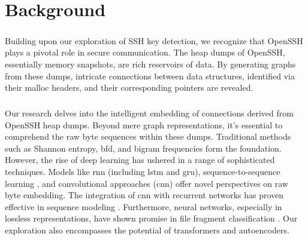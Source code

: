 \chapter{Background}\label{chap:background}



%






\paragraph*{}Building upon our exploration of SSH key detection, we recognize that OpenSSH plays a pivotal role in secure communication. The heap dumps of OpenSSH, essentially memory snapshots, are rich reservoirs of data. By generating graphs from these dumps, intricate connections between data structures, identified via their malloc headers, and their corresponding pointers are revealed.

\paragraph*{}Our research delves into the intelligent embedding of connections derived from OpenSSH heap dumps. Beyond mere graph representations, it's essential to comprehend the raw byte sequences within these dumps. Traditional methods such as Shannon entropy, \acrfull{bfd}, and bigram frequencies form the foundation. However, the rise of deep learning has ushered in a range of sophisticated techniques. Models like \acrfull{rnn} \cite{lai_recurrent_2015} (including \acrfull{lstm}\cite{hochreiter_long_1997} and \acrfull{gru}\cite{chung_empirical_2014}), sequence-to-sequence learning \cite{sutskever_sequence_2014}, and convolutional approaches (\acrshort{cnn})\cite{lecun_gradient-based_1998} offer novel perspectives on raw byte embedding. The integration of \acrshort{cnn} with recurrent networks has proven effective in sequence modeling \cite{bai_empirical_2018}. Furthermore, neural networks, especially in lossless representations, have shown promise in file fragment classification \cite{hiester_file_2018}. Our exploration also encompasses the potential of transformers\cite{vaswani_attention_2017} and autoencoders.

